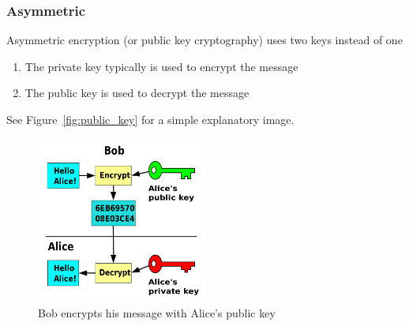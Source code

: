 \subsubsection{Asymmetric}
Asymmetric encryption (or public key cryptography) uses two keys instead of one

\begin{enumerate}
    \item The private key typically is used to encrypt the message
    \item The public key is used to decrypt the message
\end{enumerate}
See Figure~\vref{fig:public_key} for a simple explanatory image.

\begin{figure}
    \center{}
    \includegraphics[width=0.5\textwidth]{public_key}
    \caption{Bob encrypts his message with Alice's public
    key\protect\footnotemark}\label{fig:public_key}
\end{figure}
